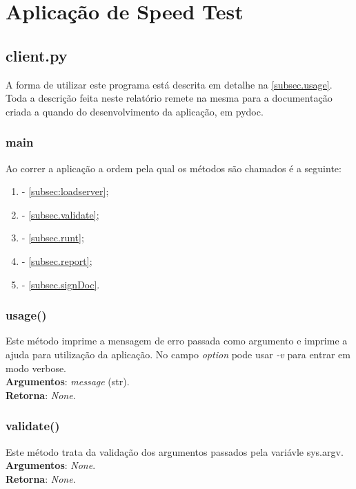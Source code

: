 \documentclass{report}
\begin{document}
\chapter{Aplicação de Speed Test}
\label{chap.Aplicação de Speed Test}
\section{client.py}
\label{sec.client}
A forma de utilizar este programa está descrita em detalhe na \autoref{subsec.usage}. Toda a descrição feita neste relatório remete na mesma para a documentação criada a quando do desenvolvimento da aplicação, em pydoc.

\subsection{main}
Ao correr a aplicação a ordem pela qual os métodos são chamados é a seguinte:
\begin{enumerate}
\item {} - \autoref{subsec:loadserver};
\item {} - \autoref{subsec.validate};
\item {} - \autoref{subsec.runt};
\item {} - \autoref{subsec.report};
\item {} - \autoref{subsec.signDoc}.
\end{enumerate}

\subsection{usage()}
\label{subsec.usage}
Este método imprime a mensagem de erro passada como argumento e imprime a ajuda para utilização da aplicação. No campo \textit{option} pode usar \textit{-v} para entrar em modo verbose.\\ 
\textbf{Argumentos}: \textit{message} (str).\\
\textbf{Retorna}: \textit{None}.

\subsection{validate()}
\label{subsec.validate}
Este método trata da validação dos argumentos passados pela variávle sys.argv.\\ 
\textbf{Argumentos}: \textit{None}.\\
\textbf{Retorna}: \textit{None}.
\end{document}
